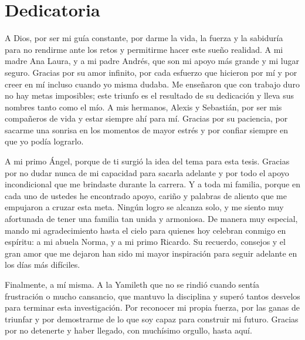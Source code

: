 \chapter*{Dedicatoria}
\thispagestyle{empty}

A Dios, por ser mi guía constante, por darme la vida, la fuerza y la sabiduría para no rendirme ante los retos y permitirme hacer este sueño realidad. A mi madre Ana Laura, y a mi padre Andrés, que son mi apoyo más grande y mi lugar seguro. Gracias por su amor infinito, por cada esfuerzo que hicieron por mí y por creer en mí incluso cuando yo misma dudaba. Me enseñaron que con trabajo duro no hay metas imposibles; este triunfo es el resultado de su dedicación y lleva sus nombres tanto como el mío. A mis hermanos, Alexis y Sebastián, por ser mis compañeros de vida y estar siempre ahí para mí. Gracias por su paciencia, por sacarme una sonrisa en los momentos de mayor estrés y por confiar siempre en que yo podía lograrlo.

A mi primo Ángel, porque de ti surgió la idea del tema para esta tesis. Gracias por no dudar nunca de mi capacidad para sacarla adelante y por todo el apoyo incondicional que me brindaste durante la carrera. Y a toda mi familia, porque en cada uno de ustedes he encontrado apoyo, cariño y palabras de aliento que me empujaron a cruzar esta meta. Ningún logro se alcanza solo, y me siento muy afortunada de tener una familia tan unida y armoniosa. De manera muy especial, mando mi agradecimiento hasta el cielo para quienes hoy celebran conmigo en espíritu: a mi abuela Norma, y a mi primo Ricardo. Su recuerdo, consejos y el gran amor que me dejaron han sido mi mayor inspiración para seguir adelante en los días más difíciles.

Finalmente, a mí misma. A la Yamileth que no se rindió cuando sentía frustración o mucho cansancio, que mantuvo la disciplina y superó tantos desvelos para terminar esta investigación. Por reconocer mi propia fuerza, por las ganas de triunfar y por demostrarme de lo que soy capaz para construir mi futuro. Gracias por no detenerte y haber llegado, con muchísimo orgullo, hasta aquí.
